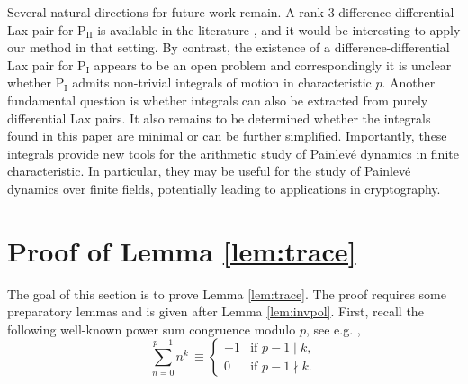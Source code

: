\documentclass[a4paper,reqno]{amsart}
\numberwithin{equation}{section}
\numberwithin{figure}{section}
\theoremstyle{remark}
\newcommand\Pone{\textrm{P}_{\textrm{I}} }
\newcommand\Ptwo{\textrm{P}_{\textrm{II}} }
\begin{document}
Several natural directions for future work remain.
A rank 3 difference-differential Lax pair for $\Ptwo$ is available in the literature \cite{adler94}, and it would be interesting to apply our method in that setting. By contrast, the existence of a difference-differential Lax pair for $\Pone$ appears to be an open problem and correspondingly it is unclear whether $\Pone$ admits non-trivial integrals of motion in characteristic $p$. Another fundamental question is whether integrals can also be extracted from purely differential Lax pairs. It also remains to be determined whether the integrals found in this paper are minimal or can be further simplified.
Importantly, these integrals provide new tools for the arithmetic study of Painlev\'e dynamics in finite characteristic. In particular, they may be useful for the study of Painlev\'e dynamics over finite fields, potentially leading to applications in cryptography.











\appendix



\section{Proof of Lemma \ref{lem:trace}}\label{sec:trac_finite}
The goal of this section is to prove Lemma \ref{lem:trace}. The proof requires some preparatory lemmas and is given after Lemma \ref{lem:invpol}. First, recall the following well-known power sum congruence modulo $p$, see e.g. \cite{macmillansondow},
\begin{equation}\label{eq:powersumcongruence}
\sum_{n=0}^{p-1}n^k\, \equiv \begin{cases}
    -1 &\text{if $p-1\mid k$},\\
    0 &\text{if $p-1 \nmid k$}.
\end{cases}
\end{equation}
\end{document}
